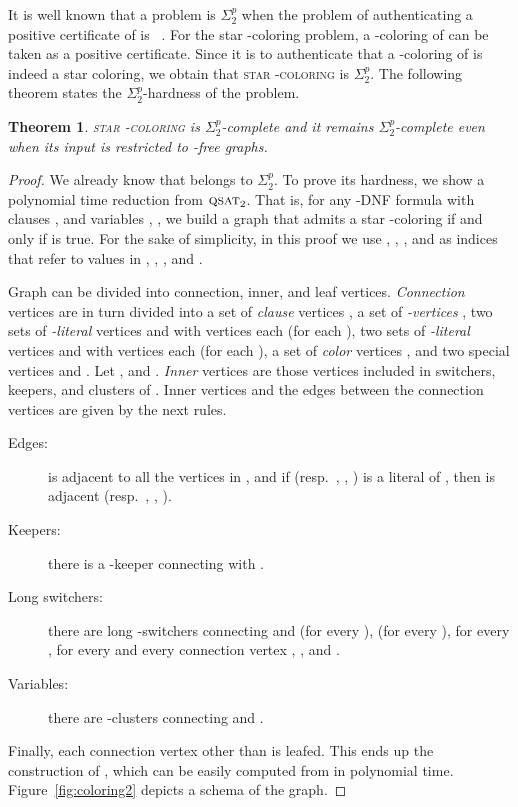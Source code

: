 \documentclass[a4paper, 11pt, oneside]{article}
\newtheorem{theorem}{Theorem}
\newcommand{\stcol}[1]{\textsc{star -coloring}}
\newcommand{\stp}{\ensuremath{\Sigma^p_2}\xspace}
\newcommand{\qsat}[1]{\ensuremath{\textsc{qsat}_{#1}}}
\let\Definition=\emph
\begin{document}
It is well known that a problem  is \stp when the problem of authenticating a positive certificate of  is ~\cite{Papadimitriou1994}.  For the star -coloring problem, a -coloring of  can be taken as a positive certificate.  Since it is  to authenticate that a -coloring of  is indeed a star coloring, we obtain that \stcol{k} is \stp.  The following theorem states the \stp-hardness of the problem.  

\begin{theorem}\label{thm:stcol-2}
 \stcol{k} is \stp-complete and it remains \stp-complete even when its input is restricted to -free graphs.
\end{theorem}

\begin{proof}
  We already know that  belongs to \stp.  To prove its hardness, we show a polynomial time reduction from \qsat{2}.  That is, for any -DNF formula  with  clauses , and  variables , , we build a graph  that admits a star -coloring if and only if  is true.  For the sake of simplicity, in this proof we use , , , and  as indices that refer to values in , , , and .

  Graph  can be divided into connection, inner, and leaf vertices.  \Definition{Connection} vertices are in turn divided into a set of \Definition{clause} vertices , a set of \Definition{-vertices} , two sets of \Definition{-literal} vertices  and  with  vertices each (for each ), two sets of \Definition{-literal} vertices  and  with  vertices each (for each ), a set of \Definition{color} vertices , and two special vertices  and . Let , and .  \Definition{Inner} vertices are those vertices included in switchers, keepers, and clusters of .  Inner vertices and the edges between the connection vertices are given by the next rules.
\begin{description}
  \item [Edges:]   is adjacent to all the vertices in , and if  (resp.\ , , ) is a literal of , then  is adjacent  (resp.\ , , ).  

  \item [Keepers:] there is a -keeper connecting  with .

  \item [Long switchers:] there are long -switchers connecting  and  (for every ),  (for every ),  for every ,  for every  and every connection vertex , , and .

  \item [Variables:] there are -clusters connecting  and .
\end{description}
Finally, each connection vertex other than  is leafed.  This ends up the construction of , which can be easily computed from  in polynomial time. Figure~\ref{fig:coloring2} depicts a schema of the graph.


\end{proof}
\end{document}
